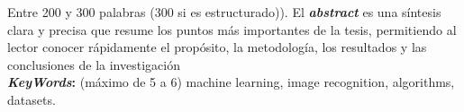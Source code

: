 Entre 200 y 300 palabras (300 si es estructurado)). El
\textbf{\textit{abstract}} es una síntesis clara y precisa que resume
los puntos más importantes de la tesis, permitiendo al lector conocer
rápidamente el propósito, la metodología, los resultados y las
conclusiones de la investigación\\

\textbf{\textit{KeyWords}:} (máximo de 5 a 6) machine learning, image
recognition, algorithms, datasets.
